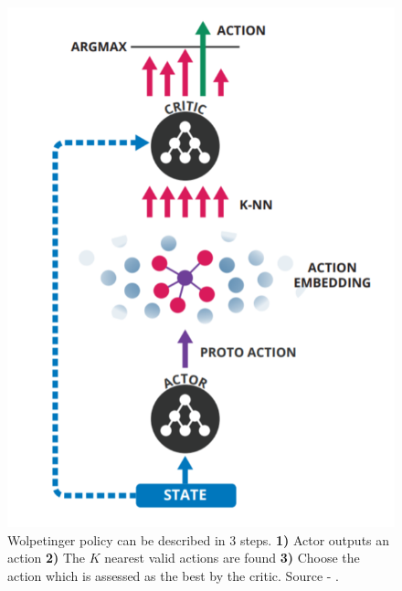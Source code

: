 \begin{figure}[!h]
\centering
\includegraphics[scale=0.35]{fig/wolpetinger-policy.png}
\caption[Wolpetinger policy illustration] {Wolpetinger policy can be described in 3 steps. \textbf{1)} Actor outputs an action \textbf{2)} The $K$ nearest valid actions are found \textbf{3)} Choose the action which is assessed as the best by the critic. Source - \cite{dulac2015}.}
\label{fig:wolpetinger}
\end{figure}


